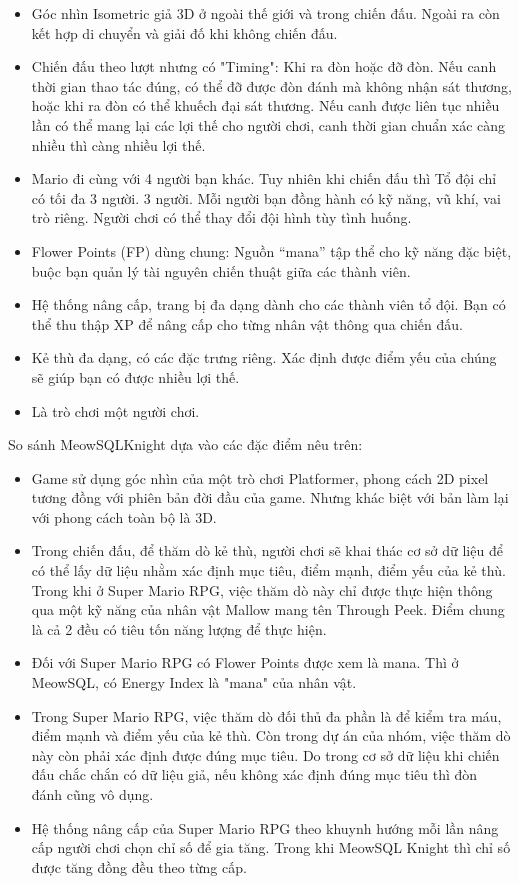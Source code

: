 \begin{itemize}
	\item Góc nhìn Isometric giả 3D ở ngoài thế giới và trong chiến đấu. Ngoài ra còn kết hợp di chuyển và giải đố khi không chiến đấu.
	\item Chiến đấu theo lượt nhưng có "Timing": Khi ra đòn hoặc đỡ đòn. Nếu canh thời gian thao tác đúng, có thể đỡ được đòn đánh mà không nhận sát thương, hoặc khi ra đòn có thể khuếch đại sát thương. Nếu canh được liên tục nhiều lần có thể mang lại các lợi thế cho người chơi, canh thời gian chuẩn xác càng nhiều thì càng nhiều lợi thế.
	\item Mario đi cùng với 4 người bạn khác. Tuy nhiên khi chiến đấu thì Tổ đội chỉ có tối đa 3 người. 3 người. Mỗi người bạn đồng hành có kỹ năng, vũ khí, vai trò riêng. Người chơi có thể thay đổi đội hình tùy tình huống.
	\item Flower Points (FP) dùng chung: Nguồn “mana” tập thể cho kỹ năng đặc biệt, buộc bạn quản lý tài nguyên chiến thuật giữa các thành viên.
	\item Hệ thống nâng cấp, trang bị đa dạng dành cho các thành viên tổ đội. Bạn có thể thu thập XP để nâng cấp cho từng nhân vật thông qua chiến đấu.
	\item Kẻ thù đa dạng, có các đặc trưng riêng. Xác định được điểm yếu của chúng sẽ giúp bạn có được nhiều lợi thế.
	\item Là trò chơi một người chơi.
\end{itemize}
\hspace*{0.5cm} So sánh MeowSQLKnight dựa vào các đặc điểm nêu trên:
\begin{itemize}
	\item Game sử dụng góc nhìn của một trò chơi Platformer, phong cách 2D pixel tương đồng với phiên bản đời đầu của game. Nhưng khác biệt với bản làm lại với phong cách toàn bộ là 3D.
	\item Trong chiến đấu, để thăm dò kẻ thù, người chơi sẽ khai thác cơ sở dữ liệu để có thể lấy dữ liệu nhằm xác định mục tiêu, điểm mạnh, điểm yếu của kẻ thù. Trong khi ở Super Mario RPG, việc thăm dò này chỉ được thực hiện thông qua một kỹ năng của nhân vật Mallow mang tên Through Peek. Điểm chung là cả 2 đều có tiêu tốn năng lượng để thực hiện.
	\item Đối với Super Mario RPG có Flower Points được xem là mana. Thì ở MeowSQL, có Energy Index là "mana" của nhân vật.
	\item Trong Super Mario RPG, việc thăm dò đối thủ đa phần là để kiểm tra máu, điểm mạnh và điểm yếu của kẻ thù. Còn trong dự án của nhóm, việc thăm dò này còn phải xác định được đúng mục tiêu. Do trong cơ sở dữ liệu khi chiến đấu chắc chắn có dữ liệu giả, nếu không xác định đúng mục tiêu thì đòn đánh cũng vô dụng.
	\item Hệ thống nâng cấp của Super Mario RPG theo khuynh hướng mỗi lần nâng cấp người chơi chọn chỉ số để gia tăng. Trong khi MeowSQL Knight thì chỉ số được tăng đồng đều theo từng cấp.
\end{itemize}
